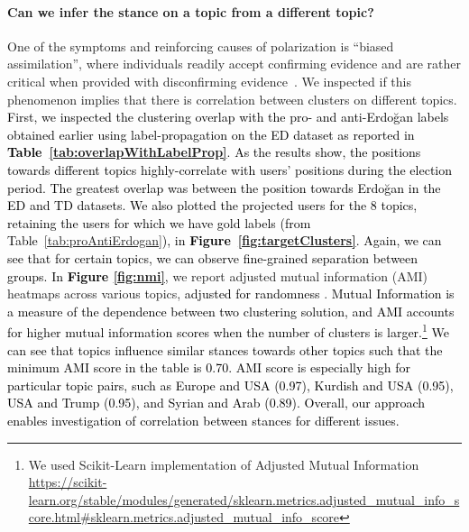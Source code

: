 \documentclass[letterpaper]{article} \usepackage{aaai20}  \usepackage{times}  \usepackage{stackengine}
\newcommand{\mucahid}{\textcolor{black}}
\newcommand{\changes}{\textcolor{black}}
\begin{document}
\paragraph{Can we infer the stance on a topic from a different topic?}
One of the symptoms and reinforcing causes of polarization is ``biased assimilation'', where individuals readily accept confirming evidence and are rather critical when provided with disconfirming evidence~\citep{Dandekar_2013}. We inspected if this phenomenon implies that there is correlation between clusters on different topics. \changes{First, we inspected the clustering overlap with the pro- and anti-Erdo\u{g}an labels obtained earlier using label-propagation on the ED dataset as reported in \textbf{Table~\ref{tab:overlapWithLabelProp}}. As the results show, the positions towards different topics highly-correlate with users' positions during the election period. The greatest overlap was between the position towards Erdo\u{g}an in the ED and TD datasets. We also plotted the projected users for the 8 topics, retaining the users for which we have gold labels (from Table~\ref{tab:proAntiErdogan}), in \textbf{Figure~\ref{fig:targetClusters}}. Again, we can see that for certain topics, we can observe fine-grained separation between groups. In \textbf{Figure \ref{fig:nmi}},} we report adjusted mutual information (AMI) heatmaps across various topics, \changes{adjusted for randomness} \citep{nmi}. \changes{Mutual Information is a measure of the dependence between two clustering solution, and AMI accounts for higher mutual information scores when the number of clusters is larger.}\footnote{We used Scikit-Learn implementation of Adjusted Mutual Information \url{https://scikit-learn.org/stable/modules/generated/sklearn.metrics.adjusted_mutual_info_score.html#sklearn.metrics.adjusted_mutual_info_score}} 
\mucahid{We can see that topics influence similar stances towards other topics such that the minimum AMI score in the table is 0.70. AMI score is especially high for particular topic pairs, such as Europe and USA (0.97), Kurdish and USA (0.95),  USA and Trump (0.95), and Syrian and Arab (0.89). Overall, our approach enables investigation of correlation between stances for different issues.} 
\end{document}
